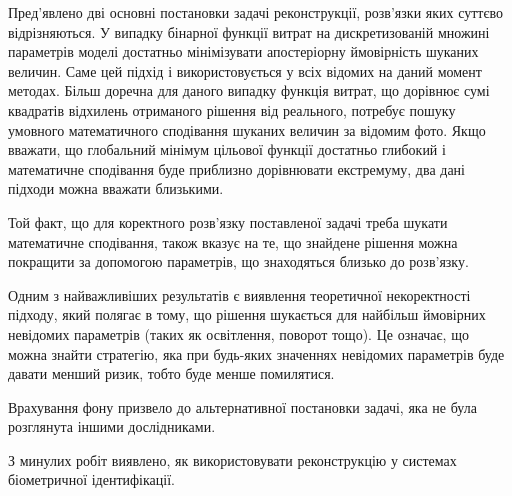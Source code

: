 \chapterConclusion

Пред'явлено дві основні постановки задачі реконструкції,
розв'язки яких суттєво відрізняються.
У випадку бінарної функції витрат на дискретизованій множині параметрів моделі
достатньо мінімізувати апостеріорну ймовірність шуканих величин.
Саме цей підхід і використовується у всіх відомих на даний момент методах.
Більш доречна для даного випадку функція витрат,
що дорівнює сумі квадратів відхилень отриманого рішення від реального,
потребує пошуку умовного математичного сподівання
шуканих величин за відомим фото.
Якщо вважати,
що глобальний мінімум цільової функції достатньо глибокий
і математичне сподівання буде приблизно дорівнювати екстремуму,
два дані підходи можна вважати близькими.

Той факт,
що для коректного розв'язку поставленої задачі треба шукати
математичне сподівання,
також вказує на те,
що знайдене рішення можна покращити за допомогою параметрів,
що знаходяться близько до розв'язку.

Одним з найважливіших результатів є виявлення теоретичної некоректності підходу,
який полягає в тому,
що рішення шукається для найбільш ймовірних невідомих параметрів
(таких як освітлення, поворот тощо).
Це означає, що можна знайти стратегію,
яка при будь-яких значеннях невідомих параметрів буде давати менший ризик,
тобто буде менше помилятися.

Врахування фону призвело до альтернативної постановки задачі,
яка не була розглянута іншими дослідниками.

З минулих робіт виявлено,
як використовувати реконструкцію у системах біометричної ідентифікації.
